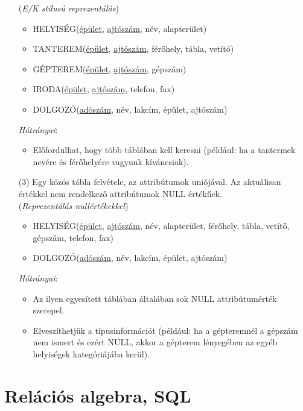 \documentclass[tikz,12pt,margin=0px]{article}
\begin{document}
\begin{itemize}
            (\emph{E/K stílusú reprezentálás})
        {\small
        \begin{itemize}
            \item HELYISÉG(\underline{épület}, \underline{ajtószám}, név, alapterület)
            \item TANTEREM(\underline{épület}, \underline{ajtószám}, férőhely, tábla, vetítő)
            \item GÉPTEREM(\underline{épület}, \underline{ajtószám}, gépszám)
            \item IRODA(\underline{épület}, \underline{ajtószám}, telefon, fax)
            \item DOLGOZÓ(\underline{adószám}, név, lakcím, épület, ajtószám)
        \end{itemize}
        }
        \emph{Hátrányai}:
        \begin{itemize}
            \item Előfordulhat, hogy több táblában kell keresni (például: ha a tantermek nevére és férőhelyére vagyunk kíváncsiak).
        \end{itemize}
        \item[(3)] Egy közös tábla felvétele, az attribútumok uniójával. Az aktuálisan értékkel nem rendelkező attribútumok NULL értékűek. \\

        (\emph{Reprezentálás nullértékekkel})
        {\small
        \begin{itemize}
            \item HELYISÉG(\underline{épület}, \underline{ajtószám}, név, alapterület, férőhely, tábla, vetítő, gépszám, telefon, fax)
            \item DOLGOZÓ(\underline{adószám}, név, lakcím, épület, ajtószám)
        \end{itemize}
        }
        \emph{Hátrányai}:
        \begin{itemize}
            \item Az ilyen egyesített táblában általában sok NULL attribútumérték szerepel.
            \item Elveszíthetjük a típusinformációt (például: ha a gépteremnél a gépszám nem ismert és ezért NULL, akkor a gépterem lényegében az egyéb helyiségek kategóriájába kerül).
        \end{itemize}
	\end{itemize}
\newpage
	\section*{Relációs algebra, SQL}
	
\end{document}
